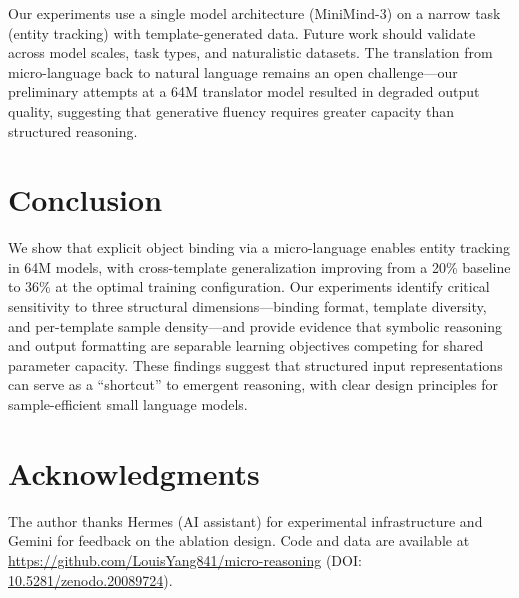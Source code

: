 \documentclass[11pt,a4paper]{article}
\begin{document}
Our experiments use a single model architecture (MiniMind-3) on a narrow task (entity tracking) with template-generated data.
Future work should validate across model scales, task types, and naturalistic datasets.
The translation from micro-language back to natural language remains an open challenge—our preliminary attempts at a 64M translator model resulted in degraded output quality, suggesting that generative fluency requires greater capacity than structured reasoning.

\section{Conclusion}

We show that explicit object binding via a micro-language enables entity tracking in 64M models, with cross-template generalization improving from a 20\% baseline to 36\% at the optimal training configuration. Our experiments identify critical sensitivity to three structural dimensions—binding format, template diversity, and per-template sample density—and provide evidence that symbolic reasoning and output formatting are separable learning objectives competing for shared parameter capacity. These findings suggest that structured input representations can serve as a ``shortcut'' to emergent reasoning, with clear design principles for sample-efficient small language models.

\section*{Acknowledgments}

The author thanks Hermes (AI assistant) for experimental infrastructure and Gemini for feedback on the ablation design.
Code and data are available at \url{https://github.com/LouisYang841/micro-reasoning} (DOI: \href{https://doi.org/10.5281/zenodo.20089724}{10.5281/zenodo.20089724}).
\end{document}
